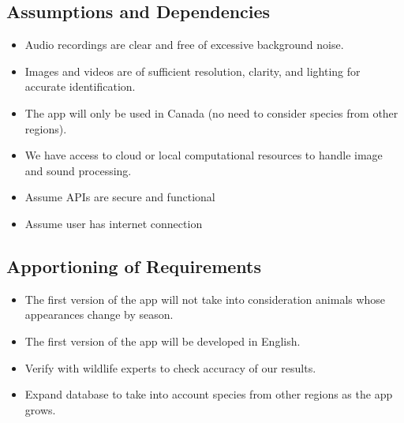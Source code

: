 \documentclass[]{article}
\begin{document}
\subsection{Assumptions and Dependencies}
\label{sub:assumptions_and_dependencies}
\begin{itemize}
	\item Audio recordings are clear and free of excessive background noise.
	\item Images and videos are of sufficient resolution, clarity, and lighting for accurate identification.
    \item The app will only be used in Canada (no need to consider species from other regions).
    \item We have access to cloud or local computational resources to handle image and sound processing.
    \item Assume APIs are secure and functional
    \item Assume user has internet connection
    
    
    
\end{itemize}


\subsection{Apportioning of Requirements}
\label{sub:apportioning_of_requirements}
\begin{itemize}
	\item The first version of the app will not take into consideration animals whose appearances change by season.
    \item The first version of the app will be developed in English.
    \item Verify with wildlife experts to check accuracy of our results.
    \item Expand database to take into account species from other regions as the app grows.
\end{itemize}

\end{document}
